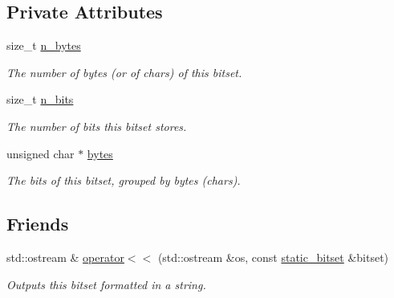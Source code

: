 \subsection*{Private Attributes}
\begin{DoxyCompactItemize}
\item 
\hypertarget{classlgraph_1_1utils_1_1static__bitset_aa3f7a6d10e41df757ca86e3636cb85d4}{size\-\_\-t \hyperlink{classlgraph_1_1utils_1_1static__bitset_aa3f7a6d10e41df757ca86e3636cb85d4}{n\-\_\-bytes}}\label{classlgraph_1_1utils_1_1static__bitset_aa3f7a6d10e41df757ca86e3636cb85d4}

\begin{DoxyCompactList}\small\item\em The number of bytes (or of chars) of this bitset. \end{DoxyCompactList}\item 
\hypertarget{classlgraph_1_1utils_1_1static__bitset_aebc02986838d70f13d3c10f390d11211}{size\-\_\-t \hyperlink{classlgraph_1_1utils_1_1static__bitset_aebc02986838d70f13d3c10f390d11211}{n\-\_\-bits}}\label{classlgraph_1_1utils_1_1static__bitset_aebc02986838d70f13d3c10f390d11211}

\begin{DoxyCompactList}\small\item\em The number of bits this bitset stores. \end{DoxyCompactList}\item 
\hypertarget{classlgraph_1_1utils_1_1static__bitset_a56d277fc22bbf71a27fca530a133c9bd}{unsigned char $\ast$ \hyperlink{classlgraph_1_1utils_1_1static__bitset_a56d277fc22bbf71a27fca530a133c9bd}{bytes}}\label{classlgraph_1_1utils_1_1static__bitset_a56d277fc22bbf71a27fca530a133c9bd}

\begin{DoxyCompactList}\small\item\em The bits of this bitset, grouped by bytes (chars). \end{DoxyCompactList}\end{DoxyCompactItemize}
\subsection*{Friends}
\begin{DoxyCompactItemize}
\item 
\hypertarget{classlgraph_1_1utils_1_1static__bitset_a8861fbd2d9aa094fd65123105fe90d0b}{std\-::ostream \& \hyperlink{classlgraph_1_1utils_1_1static__bitset_a8861fbd2d9aa094fd65123105fe90d0b}{operator$<$$<$} (std\-::ostream \&os, const \hyperlink{classlgraph_1_1utils_1_1static__bitset}{static\-\_\-bitset} \&bitset)}\label{classlgraph_1_1utils_1_1static__bitset_a8861fbd2d9aa094fd65123105fe90d0b}

\begin{DoxyCompactList}\small\item\em Outputs this bitset formatted in a string. \end{DoxyCompactList}\end{DoxyCompactItemize}


